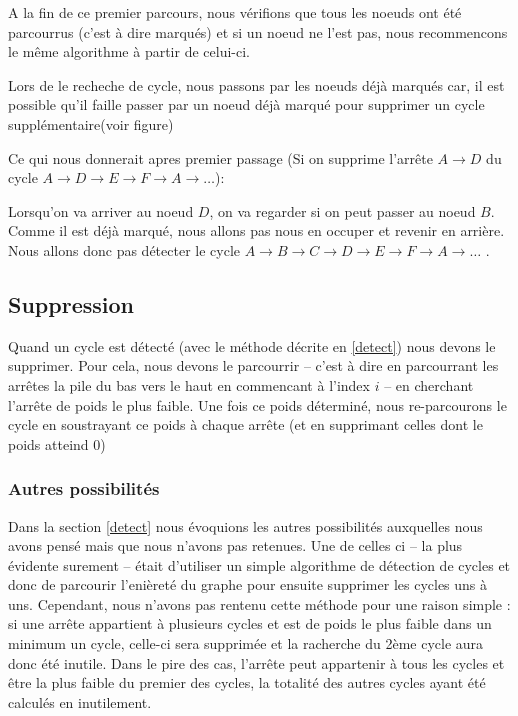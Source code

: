 \documentclass[12pt, oneside]{article}
\begin{document}
A la fin de ce premier parcours, nous vérifions que tous les noeuds ont été parcourrus (c'est à dire marqués) et si un noeud ne l'est pas, nous recommencons le même algorithme à partir de celui-ci.

Lors de le recheche de cycle, nous passons par les noeuds déjà marqués car, il est possible qu'il faille passer par un noeud déjà marqué pour supprimer un cycle supplémentaire(voir figure)


Ce qui nous donnerait apres premier passage (Si on supprime l'arrête $A \rightarrow D$ du cycle $A \rightarrow D \rightarrow E \rightarrow F \rightarrow A \rightarrow\ldots$):

Lorsqu'on va arriver au noeud $D$, on va regarder si on peut passer au noeud $B$. Comme il est déjà marqué, nous allons pas nous en occuper et revenir en arrière. Nous allons donc pas détecter le cycle $A \rightarrow B \rightarrow C \rightarrow D \rightarrow E \rightarrow F \rightarrow A \rightarrow\ldots$  .

\subsection{Suppression}
\label{del}

Quand un cycle est détecté (avec le méthode décrite en \ref{detect}) nous devons le supprimer. Pour cela, nous devons le parcourrir -- c'est à dire en parcourrant les arrêtes la pile du bas vers le haut en commencant à l'index $i$ -- en cherchant l'arrête de poids le plus faible. Une fois ce poids déterminé, nous re-parcourons le cycle en soustrayant ce poids à chaque arrête (et en supprimant celles dont le poids atteind 0)



\subsubsection{Autres possibilités}
\label{others}

Dans la section \ref{detect} nous évoquions les autres possibilités auxquelles nous avons pensé mais que nous n'avons pas retenues. Une de celles ci -- la plus évidente surement -- était d'utiliser un simple algorithme de détection de cycles et donc de parcourir l'enièreté du graphe pour ensuite supprimer les cycles uns à uns. Cependant, nous n'avons pas rentenu cette méthode pour une raison simple : si une arrête appartient à plusieurs cycles et est de poids le plus faible dans un minimum un cycle, celle-ci sera supprimée et la racherche du 2ème cycle aura donc été inutile. Dans le pire des cas, l'arrête peut appartenir à tous les cycles et être la plus faible du premier des cycles, la totalité des autres cycles ayant été calculés en inutilement.
\end{document}
